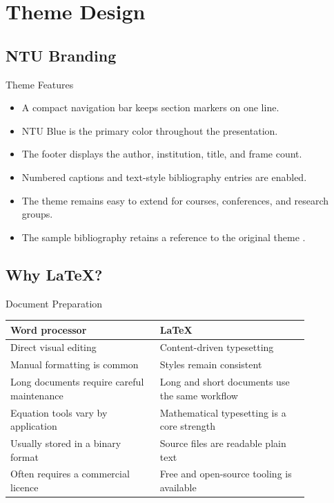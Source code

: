 \documentclass{beamer}
\begin{document}
\section{Theme Design}

\subsection{NTU Branding}

\begin{frame}{Theme Features}
  \begin{itemize}
    \item A compact navigation bar keeps section markers on one line.
    \item NTU Blue is the primary color throughout the presentation.
    \item The footer displays the author, institution, title, and frame count.
    \item Numbered captions and text-style bibliography entries are enabled.
    \item The theme remains easy to extend for courses, conferences, and research groups.
    \item The sample bibliography retains a reference to the original theme \cite{origin}.
  \end{itemize}
\end{frame}

\subsection{Why \LaTeX?}

\begin{frame}{Document Preparation}
  \begin{table}
    \centering
    \small
    \begin{tabular}{p{0.43\linewidth}|p{0.43\linewidth}}
      \textbf{Word processor} & \textbf{\LaTeX} \\
      \hline
      Direct visual editing & Content-driven typesetting \\
      Manual formatting is common & Styles remain consistent \\
      Long documents require careful maintenance & Long and short documents use the same workflow \\
      Equation tools vary by application & Mathematical typesetting is a core strength \\
      Usually stored in a binary format & Source files are readable plain text \\
      Often requires a commercial licence & Free and open-source tooling is available \\
    \end{tabular}
  \end{table}
\end{frame}
\end{document}
